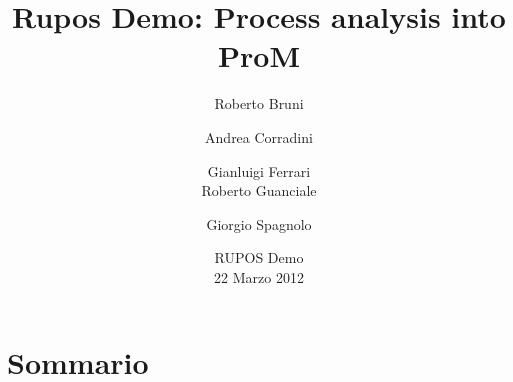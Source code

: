 \documentclass[10pt]{beamer}
\title{Rupos Demo: Process analysis into ProM}
\author[Bruni, Corradini, Ferrari, Guanciale, \alert{Spagnolo}]{Roberto Bruni \and Andrea Corradini  \and Gianluigi Ferrari\\ 
	Roberto Guanciale  \and \alert{Giorgio Spagnolo}}
\institute{Dipartimento di Informatica, Pisa}
\date{RUPOS Demo \\ 22 Marzo 2012}
\begin{document}
	\frame{\titlepage}
	
	\section{Sommario}
	
	
	
	
	
	
\end{document}
